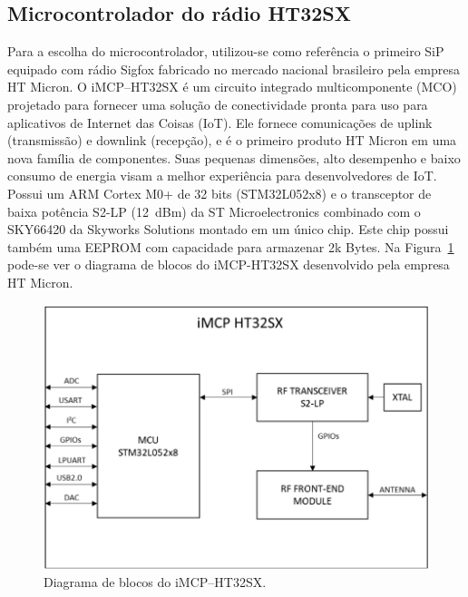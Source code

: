 \subsection{Microcontrolador do rádio HT32SX}\label{sc:HT32SX}
Para a escolha do microcontrolador, utilizou-se como referência o primeiro SiP equipado com rádio Sigfox fabricado no mercado nacional brasileiro pela empresa HT Micron. O iMCP–HT32SX é um circuito integrado multicomponente (MCO) projetado para fornecer uma solução de conectividade pronta para uso para aplicativos de Internet das Coisas (IoT). Ele fornece comunicações de uplink (transmissão) e downlink (recepção), e é o primeiro produto HT Micron em uma nova família de componentes. Suas pequenas dimensões, alto desempenho e baixo consumo de energia visam a melhor experiência para desenvolvedores de IoT. Possui um ARM Cortex M0+ de 32 bits (STM32L052x8) e o transceptor de baixa potência S2-LP (12~dBm) da ST Microelectronics combinado com o SKY66420 da Skyworks Solutions montado em um único chip. Este chip possui também uma EEPROM com capacidade para armazenar 2k Bytes. Na Figura~\ref{fig:blockHT32SX} pode-se ver o diagrama de blocos do iMCP-HT32SX desenvolvido pela empresa HT Micron.

\begin{figure}[h!]
  \caption{Diagrama de blocos do iMCP–HT32SX.}
  \begin{center}
      \includegraphics[scale=0.5]{img/imcpHT32sx.png}
  \end{center}
  \label{fig:blockHT32SX}
\end{figure}


